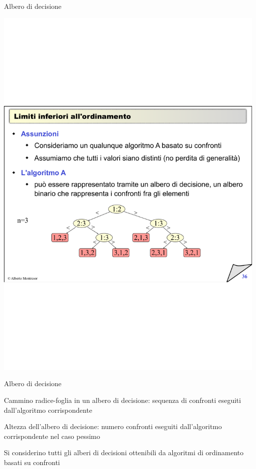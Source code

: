\begin{frame}{Albero di decisione}
	
\includegraphics[width=\textwidth]{albero-ordinamento.pdf}	
	
\end{frame}%

\begin{frame}{Albero di decisione}
	
\vspace{-9pt}
\begin{myboxtitle}[Proprietà]
\BI
\item \alert{Cammino radice-foglia in un albero di decisione}: sequenza di confronti eseguiti dall'algoritmo corrispondente
\item \alert{Altezza dell'albero di decisione}: numero confronti eseguiti dall'algoritmo corrispondente nel caso pessimo
\EI
\end{myboxtitle}

\bigskip
Si considerino tutti gli alberi di decisioni ottenibili da algoritmi di ordinamento basati su confronti

\end{frame}%

